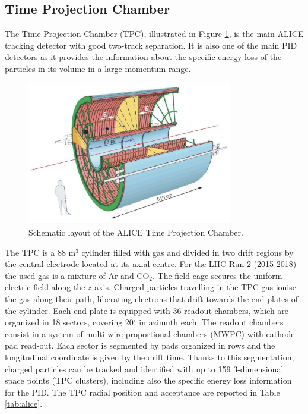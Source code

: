 %
\subsection{Time Projection Chamber} \label{sec:tpc}

The Time Projection Chamber (TPC), illustrated in Figure \ref{fig:tpc}, is the main ALICE
tracking detector with good two-track separation. It is also one of the main PID detectors as it
provides the information about the specific energy loss of the particles in its volume in a large
momentum range. 

\begin{figure}
    \captionsetup{justification=centering}
    \centering
    \includegraphics[width=0.8\textwidth]{gfx/tpc}
	\caption{Schematic layout of the ALICE Time Projection Chamber.}
	\label{fig:tpc}
\end{figure}

The TPC is a 88 m$^3$ cylinder filled with gas and divided in two drift regions by the
central electrode located at its axial centre. 
For the LHC Run 2 (2015-2018) the used gas is a mixture of Ar and CO$_2$.
The field cage secures the uniform electric field along the $z$ axis.
Charged particles travelling in the TPC gas ionise the gas along their path, liberating electrons 
that drift towards the end plates of the cylinder. 
Each end plate is equipped with 36 readout chambers, which are organized in 18 sectors, covering 
20$^{\circ}$ in azimuth each. 
The readout chambers consist in a system of multi-wire proportional chambers (MWPC) with cathode pad
read-out. Each sector is segmented by pads organized in rows and the longitudinal coordinate is given
by the drift time. 
Thanks to this segmentation, charged particles can be tracked and identified with up to 159 
3-dimensional space points (TPC clusters), including also the specific energy loss information
for the PID. The TPC radial position and acceptance are reported in Table \ref{tab:alice}.


